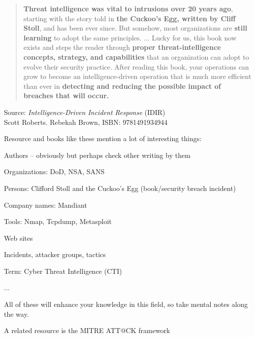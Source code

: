 \documentclass[Screen16to9,17pt]{foils}
\begin{document}


\begin{quote}
{\bf Threat intelligence was vital to intrusions over 20 years ago}, starting with the story told in {\bf the Cuckoo’s Egg, written by Cliff Stoll}, and has been ever since. But somehow, most organizations are {\bf still learning} to adopt the same principles. ... Lucky for us, this book now exists and steps the reader through {\bf proper threat-intelligence concepts, strategy, and capabilities} that an organization can adopt to evolve their security practice. After reading this book, your operations can grow to become an intelligence-driven operation that is much more efficient than ever in {\bf detecting and reducing the possible impact of breaches that will occur.}
\end{quote}
Source: \emph{Intelligence-Driven Incident Response} (IDIR)\\
 Scott Roberts. Rebekah Brown, ISBN: 9781491934944



Resource and books like these mention a lot of interesting things:
\begin{list2}
\item Authors -- obviously but perhaps check other writing by them
\item Organizations: DoD, NSA, SANS 
\item Persons: Clifford Stoll and the Cuckoo's Egg (book/security breach incident)
\item Company names: Mandiant
\item Tools: Nmap, Tcpdump, Metasploit
\item Web sites
\item Incidents, attacker groups, tactics
\item Term: Cyber Threat Intelligence (CTI)
\item ...
\end{list2}

All of these will enhance your knowledge in this field, so take mental notes along the way.

A related resource is the MITRE ATT@CK framework 


\end{document}
